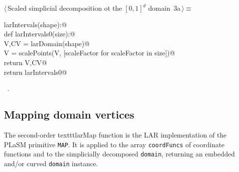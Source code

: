 \documentclass[11pt,oneside]{article}	%
\begin{document}
\begin{flushleft} \small \label{scrap2}
\protect{}$\langle\,$Scaled simplicial decomposition ot the $[0,1]^d$ domain\nobreak\ {\footnotesize 3a}$\,\rangle\equiv$
\vspace{-1ex}
\begin{list}{}{} \item
\mbox{}\verb@def larIntervals(shape):@\\
\mbox{}\verb@   def larIntervals0(size):@\\
\mbox{}\verb@      V,CV = larDomain(shape)@\\
\mbox{}\verb@      V = scalePoints(V, [scaleFactor for scaleFactor in size])@\\
\mbox{}\verb@      return V,CV@\\
\mbox{}\verb@   return larIntervals0@\\
\mbox{}\verb@@{\NWsep}
\end{list}
\vspace{-1ex}
\footnotesize\addtolength{\baselineskip}{-1ex}
\begin{list}{}{\setlength{\itemsep}{-\parsep}\setlength{\itemindent}{-\leftmargin}}
\item \NWtxtMacroRefIn\ .
\end{list}
\end{flushleft}

\subsection{Mapping domain vertices}
The second-order texttt{larMap} function is the LAR implementation of the PLaSM primitive \texttt{MAP}.
It is applied to the array \texttt{coordFuncs} of coordinate functions and to the simplicially decomposed  \texttt{domain}, returning an embedded and/or curved \texttt{domain} instance.
\end{document}
